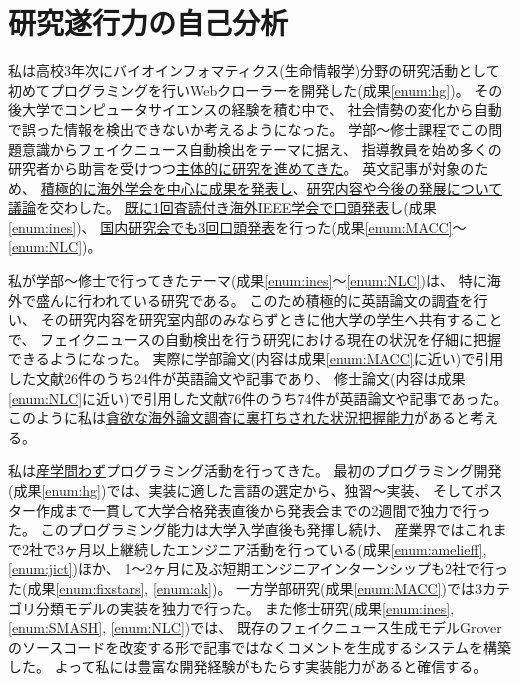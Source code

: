 
\section{研究遂行力の自己分析}

\noindent
{}

私は高校3年次にバイオインフォマティクス(生命情報学)分野の研究活動として初めてプログラミングを行いWebクローラーを開発した(成果\ref{enum:hg})。
その後大学でコンピュータサイエンスの経験を積む中で、
社会情勢の変化から自動で誤った情報を検出できないか考えるようになった。
学部〜修士課程でこの問題意識からフェイクニュース自動検出をテーマに据え、
指導教員を始め多くの研究者から助言を受けつつ\underline{主体的に研究を進めてきた}。
英文記事が対象のため、
\underline{積極的に海外学会を中心に成果を発表し}、\underline{研究内容や今後の発展について議論}を交わした。
\underline{既に1回査読付き海外IEEE学会で口頭発表}し(成果\ref{enum:ines})、
\underline{国内研究会でも3回口頭発表}を行った(成果\ref{enum:MACC}〜\ref{enum:NLC})。

私が学部〜修士で行ってきたテーマ(成果\ref{enum:ines}〜\ref{enum:NLC})は、
特に海外で盛んに行われている研究である。
このため積極的に英語論文の調査を行い、
その研究内容を研究室内部のみならずときに他大学の学生へ共有することで、
フェイクニュースの自動検出を行う研究における現在の状況を仔細に把握できるようになった。
実際に学部論文(内容は成果\ref{enum:MACC}に近い)で引用した文献26件のうち24件が英語論文や記事であり、
修士論文(内容は成果\ref{enum:NLC}に近い)で引用した文献76件のうち74件が英語論文や記事であった。
このように私は\underline{貪欲な海外論文調査に裏打ちされた状況把握能力}があると考える。

私は\underline{産学問わず}プログラミング活動を行ってきた。
最初のプログラミング開発(成果\ref{enum:hg})では、実装に適した言語の選定から、独習〜実装、
そしてポスター作成まで一貫して大学合格発表直後から発表会までの2週間で独力で行った。
このプログラミング能力は大学入学直後も発揮し続け、
産業界ではこれまで2社で3ヶ月以上継続したエンジニア活動を行っている(成果\ref{enum:amelieff}, \ref{enum:jict})ほか、
1〜2ヶ月に及ぶ短期エンジニアインターンシップも2社で行った(成果\ref{enum:fixstars}, \ref{enum:ak})。
一方学部研究(成果\ref{enum:MACC})では3カテゴリ分類モデルの実装を独力で行った。
また修士研究(成果\ref{enum:ines}, \ref{enum:SMASH}, \ref{enum:NLC})では、
既存のフェイクニュース生成モデルGrover\cite{grover}のソースコードを改変する形で記事ではなくコメントを生成するシステムを構築した。
よって私には豊富な開発経験がもたらす実装能力があると確信する。

